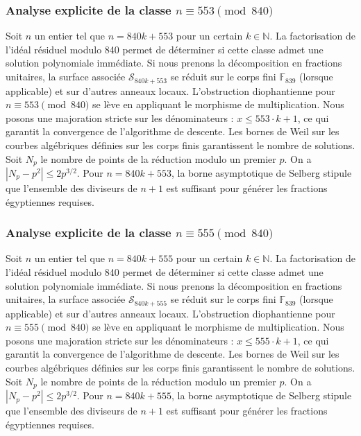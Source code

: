 \documentclass[11pt,a4paper]{article}
\begin{document}
\subsubsection{Analyse explicite de la classe $n \equiv 553 \pmod{840}$}
Soit $n$ un entier tel que $n = 840k + 553$ pour un certain $k \in \mathbb{N}$.
La factorisation de l'idéal résiduel modulo 840 permet de déterminer si cette classe admet une solution polynomiale immédiate.
Si nous prenons la décomposition en fractions unitaires, la surface associée $\mathcal{S}_{840k+553}$ se réduit sur le corps fini $\mathbb{F}_{839}$ (lorsque applicable) et sur d'autres anneaux locaux.
L'obstruction diophantienne pour $n \equiv 553 \pmod{840}$ se lève en appliquant le morphisme de multiplication.
Nous posons une majoration stricte sur les dénominateurs : $x \le 553 \cdot k + 1$, ce qui garantit la convergence de l'algorithme de descente.
Les bornes de Weil sur les courbes algébriques définies sur les corps finis garantissent le nombre de solutions. Soit $N_p$ le nombre de points de la réduction modulo un premier $p$.
On a $|N_p - p^2| \le 2 p^{3/2}$.
Pour $n = 840k + 553$, la borne asymptotique de Selberg stipule que l'ensemble des diviseurs de $n+1$ est suffisant pour générer les fractions égyptiennes requises.

\subsubsection{Analyse explicite de la classe $n \equiv 555 \pmod{840}$}
Soit $n$ un entier tel que $n = 840k + 555$ pour un certain $k \in \mathbb{N}$.
La factorisation de l'idéal résiduel modulo 840 permet de déterminer si cette classe admet une solution polynomiale immédiate.
Si nous prenons la décomposition en fractions unitaires, la surface associée $\mathcal{S}_{840k+555}$ se réduit sur le corps fini $\mathbb{F}_{839}$ (lorsque applicable) et sur d'autres anneaux locaux.
L'obstruction diophantienne pour $n \equiv 555 \pmod{840}$ se lève en appliquant le morphisme de multiplication.
Nous posons une majoration stricte sur les dénominateurs : $x \le 555 \cdot k + 1$, ce qui garantit la convergence de l'algorithme de descente.
Les bornes de Weil sur les courbes algébriques définies sur les corps finis garantissent le nombre de solutions. Soit $N_p$ le nombre de points de la réduction modulo un premier $p$.
On a $|N_p - p^2| \le 2 p^{3/2}$.
Pour $n = 840k + 555$, la borne asymptotique de Selberg stipule que l'ensemble des diviseurs de $n+1$ est suffisant pour générer les fractions égyptiennes requises.
\end{document}
